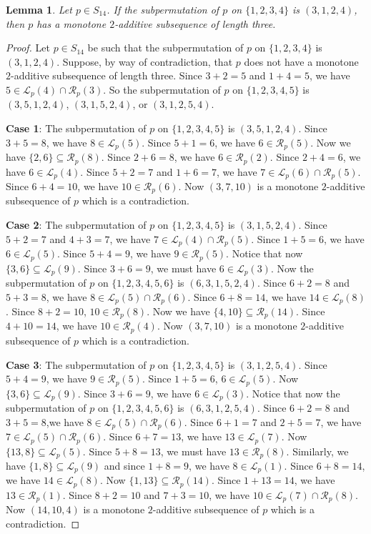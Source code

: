 \documentclass[11pt]{article}
\newtheorem{lemma}[theorem]{Lemma}
\theoremstyle{definition}
\begin{document}
\begin{lemma}\label{Lemma:Monotone3124}
Let $p\in S_{14}$. If the subpermutation of $p$ on $\{1,2,3,4\}$ is $(3,1,2,4)$, then $p$ has a monotone $2$-additive subsequence of length three.
\end{lemma}
\begin{proof}
     Let $p\in S_{14}$ be such that the subpermutation of $p$ on $\{1,2,3,4\}$ is $(3,1,2,4)$. Suppose, by way of contradiction, that $p$ does not have a monotone $2$-additive subsequence of length three. Since $3+2=5$ and $1+4=5$, we have $5\in\mathcal{L}_p(4)\cap\mathcal{R}_p(3)$. So the subpermutation of $p$ on $\{1,2,3,4,5\}$ is $(3,5,1,2,4)$, $(3,1,5,2,4)$, or $(3,1,2,5,4)$.

     {\bf Case 1}: The subpermutation of $p$ on $\{1,2,3,4,5\}$ is $(3,5,1,2,4)$. Since $3+5=8$, we have $8\in\mathcal{L}_p(5)$. Since $5+1=6$, we have $6\in\mathcal{R}_p(5)$. Now we have $\{2,6\}\subseteq\mathcal{R}_p(8)$. Since $2+6=8$, we have $6\in\mathcal{R}_p(2)$. Since $2+4=6$, we have $6\in\mathcal{L}_p(4)$. Since $5+2=7$ and $1+6=7$, we have $7\in\mathcal{L}_p(6)\cap\mathcal{R}_p(5)$. Since $6+4=10$, we have $10\in\mathcal{R}_p(6)$. Now $(3,7,10)$ is a monotone $2$-additive subsequence of $p$ which is a contradiction.

     {\bf Case 2}: The subpermutation of $p$ on $\{1,2,3,4,5\}$ is $(3,1,5,2,4)$. Since $5+2=7$ and $4+3=7$, we have $7\in\mathcal{L}_p(4)\cap\mathcal{R}_p(5)$. Since $1+5=6$, we have $6\in\mathcal{L}_p(5)$. Since $5+4=9$, we have $9\in\mathcal{R}_p(5)$. Notice that now $\{3,6\}\subseteq\mathcal{L}_p(9)$. Since $3+6=9$, we must have $6\in\mathcal{L}_p(3)$. Now the subpermutation of $p$ on $\{1,2,3,4,5,6\}$ is $(6,3,1,5,2,4)$. Since $6+2=8$ and $5+3=8$, we have $8\in\mathcal{L}_p(5)\cap\mathcal{R}_p(6)$. Since $6+8=14$, we have $14\in\mathcal{L}_p(8)$. Since $8+2=10$, $10\in\mathcal{R}_p(8)$. Now we have $\{4,10\}\subseteq\mathcal{R}_p(14)$. Since $4+10=14$, we have $10\in\mathcal{R}_p(4)$. Now $(3,7,10)$ is a monotone $2$-additive subsequence of $p$ which is a contradiction.

     {\bf Case 3}: The subpermutation of $p$ on $\{1,2,3,4,5\}$ is $(3,1,2,5,4)$. Since $5+4=9$, we have $9\in\mathcal{R}_p(5)$. Since $1+5=6$, $6\in\mathcal{L}_p(5)$. Now $\{3,6\}\subseteq\mathcal{L}_p(9)$. Since $3+6=9$, we have $6\in\mathcal{L}_p(3)$. Notice that now the subpermutation of $p$ on $\{1,2,3,4,5,6\}$ is $(6,3,1,2,5,4)$. Since $6+2=8$ and $3+5=8$,we have $8\in\mathcal{L}_p(5)\cap\mathcal{R}_p(6)$. Since $6+1=7$ and $2+5=7$, we have $7\in\mathcal{L}_p(5)\cap\mathcal{R}_p(6)$. Since $6+7=13$, we have $13\in\mathcal{L}_p(7)$. Now $\{13,8\}\subseteq\mathcal{L}_p(5)$. Since $5+8=13$, we must have $13\in\mathcal{R}_p(8)$. Similarly, we have $\{1,8\}\subseteq\mathcal{L}_p(9)$ and since $1+8=9$, we have $8\in\mathcal{L}_p(1)$. Since $6+8=14$, we have $14\in\mathcal{L}_p(8)$. Now $\{1,13\}\subseteq\mathcal{R}_p(14)$. Since $1+13=14$, we have $13\in\mathcal{R}_p(1)$. Since $8+2=10$ and $7+3=10$, we have $10\in\mathcal{L}_p(7)\cap\mathcal{R}_p(8)$. Now $(14,10,4)$ is a monotone $2$-additive subsequence of $p$ which is a contradiction.
\end{proof}
\end{document}
